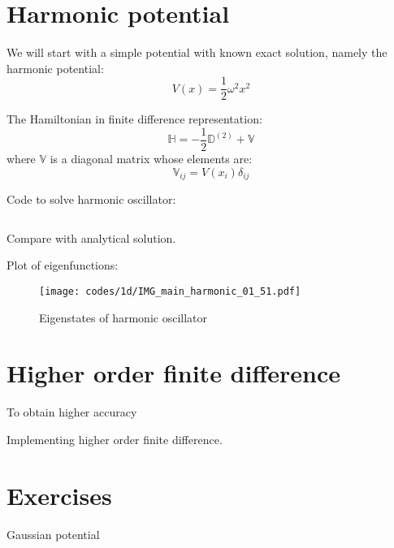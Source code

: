 \section{Harmonic potential}

We will start with a simple potential with known exact solution, namely the harmonic potential:
\begin{equation}
V(x) = \frac{1}{2}\omega^2 x^2
\end{equation}

The Hamiltonian in finite difference representation:
\begin{equation}
\mathbb{H} = -\frac{1}{2}\mathbb{D}^{(2)} + \mathbb{V}
\end{equation}
where $\mathbb{V}$ is a diagonal matrix whose elements are:
\begin{equation}
\mathbb{V}_{ij} = V(x_{i})\delta_{ij}
\end{equation}


Code to solve harmonic oscillator:

\inputminted[breaklines,fontsize=\scriptsize]{julia}{codes/1d/main_harmonic_01.jl}

Compare with analytical solution.

Plot of eigenfunctions:

\begin{figure}[H]
{\center
\texttt{[image: codes/1d/IMG\_main\_harmonic\_01\_51.pdf]}
\par}
\caption{Eigenstates of harmonic oscillator}
\end{figure}


\section{Higher order finite difference}

To obtain higher accuracy

Implementing higher order finite difference.


\section{Exercises}

Gaussian potential

